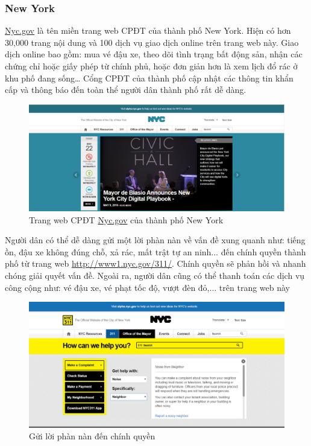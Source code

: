 \documentclass[a4paper]{article}
\begin{document}
\subsubsection{New York}
\href{nyc.gov}{Nyc.gov} là tên miền trang web CPĐT của thành phố New York. Hiện có hơn 30,000 trang nội dung và 100 dịch vụ giao dịch online trên trang web này. Giao dịch online bao gồm: mua vé đậu xe, theo dõi tình trạng bất động sản, nhận các chứng chỉ hoặc giấy phép từ chính phủ, hoặc đơn giản hơn là xem lịch đổ rác ở khu phố đang sống… Cổng CPĐT của thành phố cập nhật các thông tin khẩn cấp và thông báo đến toàn thể người dân thành phố rất dễ dàng.
\newpage
\begin{center}
    \begin{figure}[t]
    \begin{center}
     \includegraphics[scale=.3]{newyork.PNG}
    \end{center}
    \caption{Trang web CPĐT \href{nyc.gov}{Nyc.gov} của thành phố New York}
    \label{refhinh2}
    \end{figure}
\end{center}
Người dân có thể dễ dàng gửi một lời phàn nàn về vấn đề xung quanh như: tiếng ồn, đậu xe không đúng chỗ, xả rác, mất trật tự an ninh... đến chính quyền thành phố từ trang web \href{http://www1.nyc.gov/311/}{http://www1.nyc.gov/311/}. Chính quyền sẽ phản hồi và nhanh chóng giải quyết vấn đề. Ngoài ra, người dân cũng có thể thanh toán các dịch vụ công cộng như: vé đậu xe, vé phạt tốc độ, vượt đèn đỏ,... trên trang web này
\begin{center}
    \begin{figure}[h]
    \begin{center}
     \includegraphics[scale=.4]{newyork_complaint.PNG}
    \end{center}
    \caption{Gửi lời phàn nàn đến chính quyền}
    \label{refhinh2}
    \end{figure}
\end{center}
\end{document}
